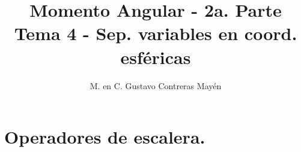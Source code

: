 
\usepackage{apacite}
\title{Momento Angular - 2a. Parte \\ \large {Tema 4 - Sep. variables en coord. esféricas} \vspace{-3ex}}
\author{M. en C. Gustavo Contreras Mayén}
\date{ }

\vspace{-4cm}
\maketitle
\fontsize{14}{14}\selectfont
\tableofcontents
\newpage
\section{Operadores de escalera.}

